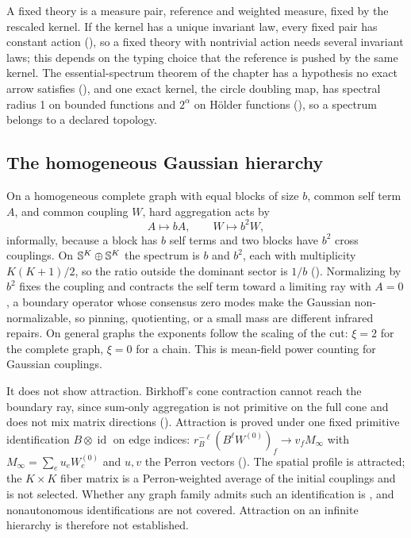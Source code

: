 A fixed theory is a measure pair, reference and weighted measure, fixed by the rescaled kernel. If the
kernel has a unique invariant law, every fixed pair has constant action
(), so a fixed theory with nontrivial action needs several
invariant laws; this depends on the typing choice that the reference is pushed by the same kernel. The
essential-spectrum theorem of the chapter has a hypothesis no exact arrow satisfies
(), and one exact kernel, the circle doubling map, has spectral radius
1 on bounded functions and \(2^\alpha\) on Hölder functions (), so a
spectrum belongs to a declared topology.

\subsection{The homogeneous Gaussian hierarchy}
\label{comp:sb-gauss-hierarchy}

On a homogeneous complete graph with equal blocks of size \(b\), common self term \(A\), and common
coupling \(W\), hard aggregation acts by
\[
A\longmapsto bA,\qquad W\longmapsto b^2W,
\]
informally, because a block has \(b\) self terms and two blocks have \(b^2\) cross couplings. On
\(\mathbb S^K\oplus\mathbb S^K\) the spectrum is \(b\) and \(b^2\), each with multiplicity \(K(K+1)/2\), so the ratio
outside the dominant sector is \(1/b\) (). Normalizing by \(b^2\) fixes the
coupling and contracts the self term toward a limiting ray with \(A=0\), a boundary operator whose
consensus zero modes make the Gaussian non-normalizable, so pinning, quotienting, or a small mass are
different infrared repairs. On general graphs the exponents follow the scaling of the cut: \(\xi=2\) for
the complete graph, \(\xi=0\) for a chain. This is mean-field power counting for Gaussian couplings.

It does not show attraction. Birkhoff's cone contraction cannot reach the boundary ray, since sum-only
aggregation is not primitive on the full cone and does not mix matrix directions
(). Attraction is proved under one fixed primitive identification
\(B\otimes\operatorname{id}\) on edge indices:
\(r_B^{-\ell}(B^\ell W^{(0)})_f\to v_fM_\infty\) with \(M_\infty=\sum_eu_eW^{(0)}_e\) and \(u,v\) the Perron
vectors (). The spatial profile is attracted; the \(K\times K\) fiber matrix is
a Perron-weighted average of the initial couplings and is not selected. Whether any graph family admits such
an identification is , and nonautonomous identifications are not covered.
Attraction on an infinite hierarchy is therefore not established.

